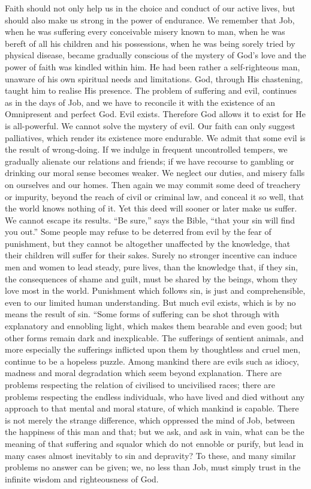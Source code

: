Faith should not only help us in the
choice and conduct of our active lives, but
should also make us strong in the power of
endurance. We remember that Job, when
he was suffering every conceivable misery
known to man, when he was bereft of all his
children and his possessions, when he was
being sorely tried by physical disease,
became gradually conscious of the mystery
of God’s love and the power of faith was
kindled within him. He had been rather a
self-righteous man, unaware of his own
spiritual needs and limitations. God,
through His chastening, taught him to realise
His presence. The problem of suffering
and evil, continues as in the days of Job, and
we have to reconcile it with the existence of
an Omnipresent and perfect God. Evil
exists. Therefore God allows it to exist
for He is all-powerful. We cannot solve
the mystery of evil. Our faith can only
suggest palliatives, which render its existence
more endurable. We admit that some evil
is the result of wrong-doing. If we indulge
in frequent uncontrolled tempers, we gradually
alienate our relations and friends; if we
have recourse to gambling or drinking our
moral sense becomes weaker. We neglect
our duties, and misery falls on ourselves and
our homes. Then again we may commit
some deed of treachery or impurity,
beyond the reach of civil or criminal law, and
conceal it so well, that the world knows
nothing of it. Yet this deed will sooner or
later make us suffer. We cannot escape its
results. “Be sure,” says the Bible, “that
your sin will find you out.” Some people
may refuse to be deterred from evil by the
fear of punishment, but they cannot be
altogether unaffected by the knowledge, that
their children will suffer for their sakes.
Surely no stronger incentive can induce men
and women to lead steady, pure lives, than
the knowledge that, if they sin, the
consequences of shame and guilt, must be shared
by the beings, whom they love most in the
world. Punishment which follows sin, is just
and comprehensible, even to our limited
human understanding. But much evil exists,
which is by no means the result of sin.
“Some forms of suffering can be shot
through with explanatory and ennobling
light, which makes them bearable and even
good; but other forms remain dark and
inexplicable. The sufferings of sentient
animals, and more especially the sufferings
inflicted upon them by thoughtless and cruel
men, continue to be a hopeless puzzle.
Among mankind there are evils such as
idiocy, madness and moral degradation
which seem beyond explanation. There are
problems respecting the relation of civilised
to uncivilised races; there are problems
respecting the endless individuals, who have
lived and died without any approach to that
mental and moral stature, of which mankind
is capable. There is not merely the strange
difference, which oppressed the mind of Job,
between the happiness of this man and that;
but we ask, and ask in vain, what can be the
meaning of that suffering and squalor which
do not ennoble or purify, but lead in many
cases almost inevitably to sin and depravity?
To these, and many similar problems no
answer can be given; we, no less than Job,
must simply trust in the infinite wisdom and
righteousness of God.


